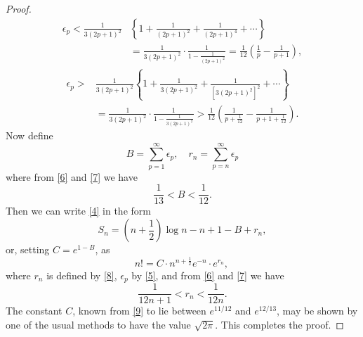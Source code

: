 \documentclass[leqno]{article}
\begin{document}
\begin{proof}
\begin{equation}
		\label{6}
		\begin{split}
			\epsilon_{p} < \frac{1}{3(2 p+1)^{2}}&\left\{1+\frac{1}{(2 p+1)^{2}}+\frac{1}{(2 p+1)^{4}}+\cdots\right\} \\
			&=\frac{1}{3(2 p+1)^{2}} \cdot \frac{1}{1-\frac{1}{(2 p+1)^{2}}}=\frac{1}{12}\left(\frac{1}{p}-\frac{1}{p+1}\right),
		\end{split}
	\end{equation}
	\begin{equation}
		\label{7}
		\begin{split}
			\epsilon_{p}>&\frac{1}{3(2 p+1)^{2}}\left\{1+\frac{1}{3(2 p+1)^{2}}+\frac{1}{\left[3(2 p+1)^{2}\right]^{2}}+\cdots\right\} \\
			&=\frac{1}{3(2 p+1)^{2}} \cdot \frac{1}{1-\frac{1}{3(2 p+1)^{2}}}>\frac{1}{12}\left(\frac{1}{p+\frac{1}{12}}-\frac{1}{p+1+\frac{1}{12}}\right).
		\end{split}
	\end{equation}
	Now define
	\begin{equation} \label{8}
		B=\sum_{p=1}^{\infty} \epsilon_{p}, \quad r_{n}=\sum_{p=n}^{\infty} \epsilon_{p}
	\end{equation}
	where from \eqref{6} and \eqref{7} we have
	\begin{equation}
		\label{9}
		\frac{1}{13} < B < \frac{1}{12}.
	\end{equation}
	Then we can write \eqref{4} in the form
	\begin{equation*}
		S_{n}=\left(n+\frac{1}{2}\right) \log n-n+1-B+r_{n},
	\end{equation*}
	or, setting $C=e^{1-B}$, as
	\begin{equation*}
		n !=C \cdot n^{n+\frac 12} e^{-n} \cdot e^{r_{n}} \text {, }
	\end{equation*}
	where $r_{n}$ is defined by \eqref{8}, $\epsilon_{p}$ by \eqref{5}, and from \eqref{6} and \eqref{7} we have
	\begin{equation*}
		\frac{1}{12 n+1}<r_{n}<\frac{1}{12 n}.
	\end{equation*}
	The constant $C$, known from \eqref{9} to lie between $e^{11 / 12}$ and $e^{12 / 13}$, may be shown by one of the usual methods to have the value $\sqrt{2 \pi}$. This completes the proof.
\end{proof}
\end{document}
